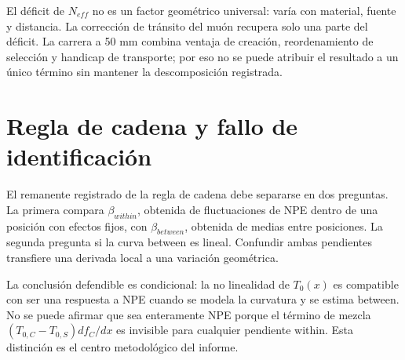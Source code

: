 El déficit de $N_{eff}$ no es un factor geométrico universal: varía con material, fuente y distancia. La corrección de tránsito del muón recupera solo una parte del déficit. La carrera a 50 mm combina ventaja de creación, reordenamiento de selección y handicap de transporte; por eso no se puede atribuir el resultado a un único término sin mantener la descomposición registrada.

\chapter{Regla de cadena y fallo de identificación}
El remanente registrado de la regla de cadena debe separarse en dos preguntas. La primera compara $\beta_{within}$, obtenida de fluctuaciones de NPE dentro de una posición con efectos fijos, con $\beta_{between}$, obtenida de medias entre posiciones. La segunda pregunta si la curva between es lineal. Confundir ambas pendientes transfiere una derivada local a una variación geométrica.


La conclusión defendible es condicional: la no linealidad de $T_0(x)$ es compatible con ser una respuesta a NPE cuando se modela la curvatura y se estima between. No se puede afirmar que sea enteramente NPE porque el término de mezcla $(T_{0,C}-T_{0,S})df_C/dx$ es invisible para cualquier pendiente within. Esta distinción es el centro metodológico del informe.

